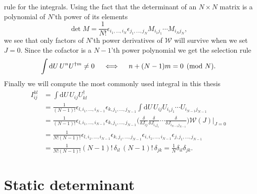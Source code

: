 rule for the integrals. Using the fact that the determinant of an $N \times N$ matrix is a
polynomial of $N$'th power of its elements
%
\begin{equation}
  \det M = \frac{1}{N!} \epsilon_{i_1,\dots,i_N} \epsilon_{j_1, \dots, j_N}
  M_{i_1j_1} \cdots M_{i_Nj_N},
\end{equation}
%
we see that only factors of $N$'th power derivatives of $\mathcal{W}$ will
survive when we set $J=0$. Since the cofactor is a $N-1$'th power polynomial we
get the selection rule
%
\begin{equation} \label{eq-integral-selection-rule}
  \int \mathrm{d} U \, U^n U^{\dagger m} \neq 0  \hskip1em\iff\hskip1em n + (N-1)m = 0 \pmod N.
\end{equation}
%
Finally we will compute the most commonly used integral in this thesis
%
\begin{align}
  I_{ij}^{kl} &= \int \mathrm{d} U \, U_{ij} U^{\dagger}_{kl} \nonumber\\
  &= \frac{1}{(N-1)!} \epsilon_{l,i_1,\dots,i_{N-1}} \epsilon_{k, j_1, \dots, j_{N-1}}
    \int \mathrm{d} U \, U_{ij} U_{i_1j_1} \cdots U_{i_{N-1}j_{N-1}} \nonumber\\
  &= \frac{1}{(N-1)!} \epsilon_{l,i_1,\dots,i_{N-1}} \epsilon_{k, j_1, \dots, j_{N-1}}
    \bigg( \frac{\delta}{\delta J_{ij}} \frac{\delta}{\delta J_{i_1j_1}} \cdots
    \frac{\delta}{\delta J_{i_{N-1}j_{N-1}}} \bigg) \mathcal{W}(J) \bigg|_{J=0}
    \nonumber \\
  &= \frac{1}{N!(N-1)!} \epsilon_{l,i_1,\dots,i_{N-1}} \epsilon_{k, j_1, \dots, j_{N-1}}
  \epsilon_{i,i_1,\dots,i_{N-1}} \epsilon_{j,j_1,\dots,j_{N-1}} \nonumber \\
  &= \frac{1}{N!(N-1)!} (N-1)!\,\delta_{il}\,(N-1)!\,\delta_{jk} = \frac{1}{N}
  \delta_{il} \delta_{jk} .
\end{align}

\section{Static determinant} \label{sec-evaluating-fermion-determinants}

